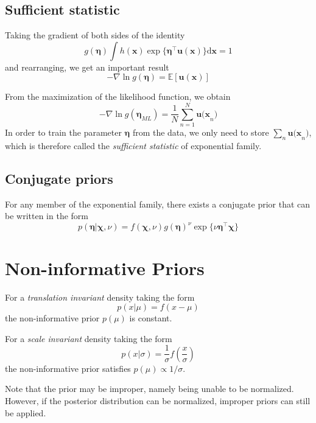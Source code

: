 \documentclass[a4paper]{report}
\newcommand{\ud}{\mathrm{d}}
\renewcommand{\bf}{\mathbf}
\newcommand{\bb}{\mathbb}
\newcommand{\imp}[1]{{\color{blue}\textit{#1}}}
\begin{document}
\subsection{Sufficient statistic}
Taking the gradient of both sides of the identity
\begin{equation}
	g(\boldsymbol{\eta})\int h(\bf{x})\exp \{ \boldsymbol{\eta}^{\intercal} \bf{u(x)} \} \ud \bf{x} = 1
\end{equation}
and rearranging, we get an important result
\begin{equation}
	-\nabla \ln g(\boldsymbol \eta) = \bb{E}[\bf{u(x)}] \label{Exp}
\end{equation}

From the maximization of the likelihood function, we obtain
\begin{equation}
	-\nabla \ln g(\boldsymbol{\eta}_{ML}) = \frac{1}{N} \sum_{n=1}^{N} \bf{u(x}_n)
\end{equation}
In order to train the parameter $\boldsymbol{\eta}$ from the data, we only need to store $\sum_n \bf{u(x}_n)$, which is therefore called the \imp{sufficient statistic} of exponential family.
\subsection{Conjugate priors}
For any member of the exponential family, there exists a conjugate prior that can be written in the form
\begin{equation}
	p(\boldsymbol{\eta}|\boldsymbol{\chi},\nu)=f(\boldsymbol{\chi},\nu)g(\boldsymbol{\eta})^{\nu}\exp\{\nu \boldsymbol{\eta^{\intercal}\chi}\}
\end{equation}
\section{Non-informative Priors}
For a \imp{translation invariant} density taking the form
\begin{equation}
	p(x|\mu)=f(x-\mu)
\end{equation}
the non-informative prior $p(\mu)$ is constant.

For a \imp{scale invariant} density taking the form
\begin{equation}
	p(x|\sigma)=\frac{1}{\sigma} f(\frac{x}{\sigma})
\end{equation}
the non-informative prior satisfies $p(\mu) \propto 1/\sigma$.

Note that the prior may be improper, namely being unable to be normalized. However, if the posterior distribution can be normalized, improper priors can still be applied.
\end{document}
